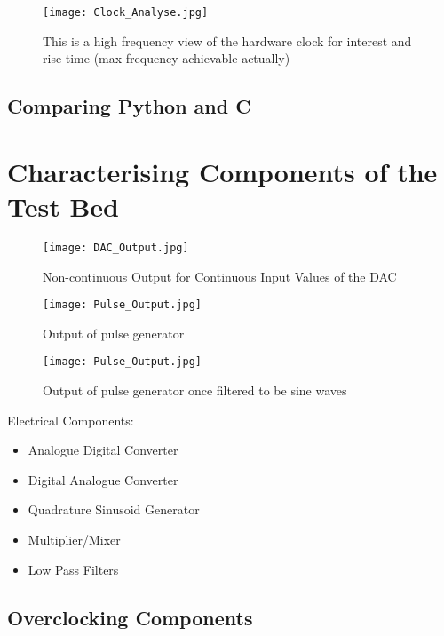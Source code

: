 \documentclass[../main.tex]{subfiles}
\begin{document}
\begin{figure}[ht]
	\centering
	\texttt{[image: Clock\_Analyse.jpg]}
	\caption{This is a high frequency view of the hardware clock for interest and rise-time (max frequency achievable actually)}
\end{figure}

\subsection{Comparing Python and C} \label{sec_Comparing Python and C}


\section{Characterising Components of the Test Bed} \label{sec_Components}

\begin{figure}[ht]
	\centering
	\texttt{[image: DAC\_Output.jpg]}
	\caption{Non-continuous Output for Continuous Input Values of the DAC}
\end{figure}

\begin{figure}[ht]
	\centering
	\texttt{[image: Pulse\_Output.jpg]}
	\caption{Output of pulse generator}
\end{figure}

\begin{figure}[ht]
	\centering
	\texttt{[image: Pulse\_Output.jpg]}
	\caption{Output of pulse generator once filtered to be sine waves}
\end{figure}



Electrical Components:
\begin{itemize}
	\item Analogue Digital Converter
	\item Digital Analogue Converter
	\item Quadrature Sinusoid Generator
	\item Multiplier/Mixer
	\item Low Pass Filters
\end{itemize}

\subsection{Overclocking Components}
\end{document}
